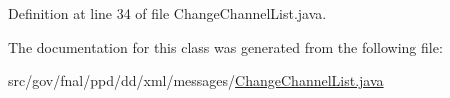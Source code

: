 Definition at line 34 of file Change\-Channel\-List.\-java.



The documentation for this class was generated from the following file\-:\begin{DoxyCompactItemize}
\item 
src/gov/fnal/ppd/dd/xml/messages/\hyperlink{ChangeChannelList_8java}{Change\-Channel\-List.\-java}\end{DoxyCompactItemize}
